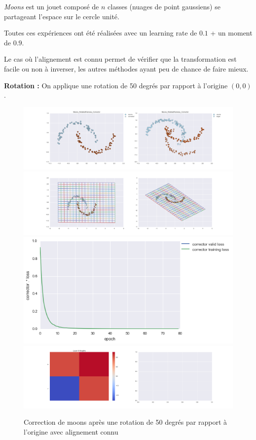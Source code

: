 

\emph{Moons} est un jouet composé de $n$ classes (nuages de point gaussiens) se partageant 
l'espace sur le cercle unité.

Toutes ces expériences ont été réalisées avec un learning rate de $0.1$ + un moment de $0.9$.

Le cas où l'alignement est connu permet de vérifier que la transformation est facile ou non 
à inverser, les autres méthodes ayant peu de chance de faire mieux.

{\Large \textbf{Rotation :}} On applique une rotation de 50 degrés par rapport à l'origine $(0,0)$.

\begin{figure}[H] %
\centering
\includegraphics[width=\linewidth]{fig/24-05-2016/moons/Moons_RotatedPairwise_Corrector-DATA.png}
\includegraphics[width=\linewidth]{fig/24-05-2016/moons/Moons_RotatedPairwise_Corrector-GridCheck.png}
\includegraphics[width=0.45\linewidth]{fig/24-05-2016/moons/Moons_RotatedPairwise_Corrector-Learning_curve.png}
\includegraphics[width=\linewidth]{fig/24-05-2016/moons/Moons_RotatedPairwise_Corrector-W.png}
\caption{Correction de moons après une rotation de 50 degrés par rapport à l'origine avec alignement connu}
\label{fig:recap-moons-rot-pairwise}
\end{figure}

